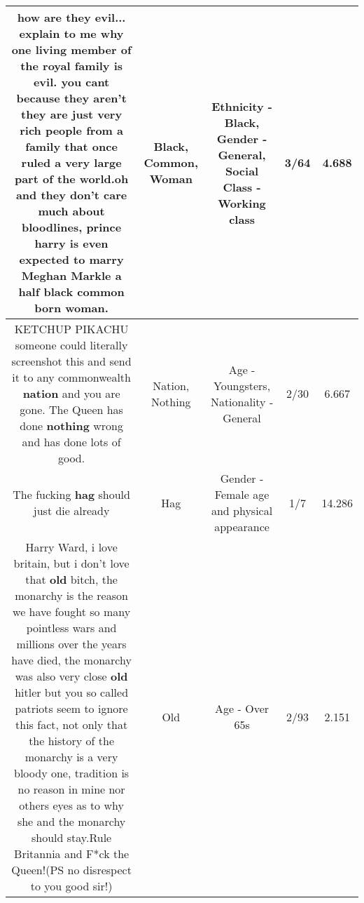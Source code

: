 \documentclass[11pt]{article}
\newlength\mylength
\begin{document}
\begin{center}
\begin{longtable}{|C{.65\mylength}|C{.30\mylength}|C{.12\mylength}|C{.12\mylength}|C{.12\mylength}|}
  \small how are they evil... explain to me why one living member of the royal family is evil. you cant because they aren't they are just very rich people from a family that once ruled a very large part of the world.oh and they don't care much about bloodlines, prince harry is even expected to marry Meghan Markle a half \textbf{black} \textbf{common} born \textbf{woman}.\normalsize   & Black, Common, Woman & Ethnicity - Black, Gender - General, Social Class - Working class & 3/64 & 4.688 \\  \hline
  \small KETCHUP PIKACHU someone could literally screenshot this and send it to any commonwealth \textbf{nation} and you are gone. The Queen has done \textbf{nothing} wrong and has done lots of good.\normalsize   & Nation, Nothing & Age - Youngsters, Nationality - General & 2/30 & 6.667 \\  \hline
  \small The fucking \textbf{hag} should just die already\normalsize   & Hag & Gender - Female age and physical appearance & 1/7 & 14.286 \\  \hline
  \small Harry Ward, i love britain, but i don't love that \textbf{old} bitch, the monarchy is the reason we have fought so many pointless wars and millions over the years have died, the monarchy was also very close \textbf{old} hitler but you so called patriots seem to ignore this fact, not only that the history of the monarchy is a very bloody one, tradition is no reason in mine nor others eyes as to why she and the monarchy should stay.Rule Britannia and F*ck the Queen!(PS no disrespect to you good sir!)\normalsize   & Old & Age - Over 65s & 2/93 & 2.151 \\  \hline

\end{longtable}
\end{center}
\end{document}
